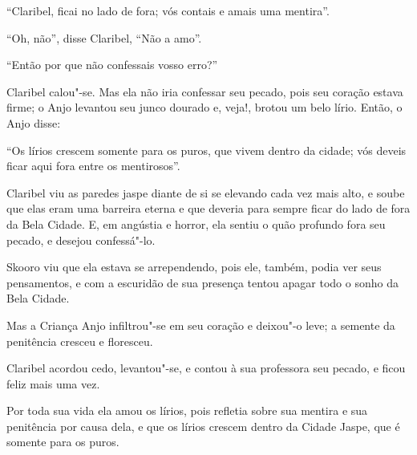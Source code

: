 ``Claribel, ficai no lado de fora; vós contais e amais uma mentira''.

``Oh, não'', disse Claribel, ``Não a amo''.



``Então por que não confessais vosso erro?''

Claribel calou"-se. Mas ela não iria confessar seu pecado, pois seu
coração estava firme; o Anjo levantou seu junco dourado e, veja!, brotou
um belo lírio. Então, o Anjo disse:

``Os lírios crescem somente para os puros, que vivem dentro da cidade;
vós deveis ficar aqui fora entre os mentirosos''.

Claribel viu as paredes jaspe diante de si se elevando cada vez mais
alto, e soube que elas eram uma barreira eterna e que deveria para
sempre ficar do lado de fora da Bela Cidade. E, em angústia e horror,
ela sentiu o quão profundo fora seu pecado, e desejou confessá"-lo.

Skooro viu que ela estava se arrependendo, pois ele, também, podia ver
seus pensamentos, e com a escuridão de sua presença tentou apagar todo o
sonho da Bela Cidade.

Mas a Criança Anjo infiltrou"-se em seu coração e deixou"-o leve; a
semente da penitência cresceu e floresceu.

Claribel acordou cedo, levantou"-se, e contou à sua professora seu
pecado, e ficou feliz mais uma vez.

Por toda sua vida ela amou os lírios, pois refletia sobre sua mentira e
sua penitência por causa dela, e que os lírios crescem dentro da Cidade
Jaspe, que é somente para os puros.


